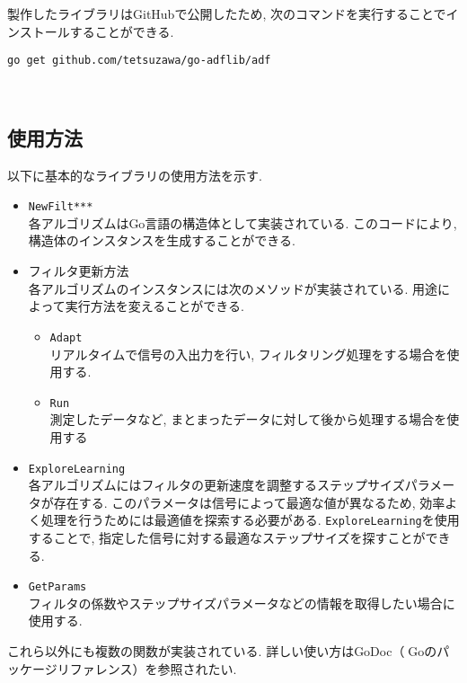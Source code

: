 製作したライブラリはGitHub\cite{go-adflib:online}で公開したため, 次のコマンドを実行することでインストールすることができる. 

\texttt{go\ get\ github.com/tetsuzawa/go-adflib/adf}

\
\subsection{使用方法}\label{how-to-use}

以下に基本的なライブラリの使用方法を示す. 

\begin{itemize}
\tightlist
\item
  \texttt{NewFilt***} \\ 
  各アルゴリズムはGo言語の構造体として実装されている. このコードにより, 構造体のインスタンスを生成することができる. 
\item
  フィルタ更新方法 \\
  各アルゴリズムのインスタンスには次のメソッドが実装されている. 用途によって実行方法を変えることができる. 

  \begin{itemize}
  \tightlist
  \item
    \texttt{Adapt} \\
    リアルタイムで信号の入出力を行い, フィルタリング処理をする場合を使用する. 
  \item
    \texttt{Run} \\
    測定したデータなど, まとまったデータに対して後から処理する場合を使用する
  \end{itemize}
\item
  \texttt{ExploreLearning} \\
  各アルゴリズムにはフィルタの更新速度を調整するステップサイズパラメータが存在する. このパラメータは信号によって最適な値が異なるため, 効率よく処理を行うためには最適値を探索する必要がある. \texttt{ExploreLearning}を使用することで, 指定した信号に対する最適なステップサイズを探すことができる. 
\item
  \texttt{GetParams} \\
  フィルタの係数やステップサイズパラメータなどの情報を取得したい場合に使用する. 
\end{itemize}

これら以外にも複数の関数が実装されている. 詳しい使い方はGoDoc（Goのパッケージリファレンス）\cite{godoc:online}を参照されたい. 
